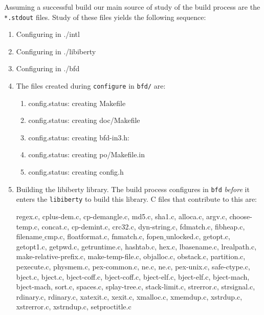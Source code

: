 Assuming  a successful build  our main  source of  study of  the build
process are the \texttt{*.stdout}  files.  Study of these files yields
the following sequence:
\begin{enumerate}[noitemsep]
\item Configuring in ./intl
\item Configuring in ./libiberty
\item Configuring in ./bfd
\item The files created during \texttt{configure} in \texttt{bfd/} are:
  \begin{enumerate}
  \item config.status: creating Makefile
  \item config.status: creating doc/Makefile
  \item config.status: creating bfd-in3.h:
  \item config.status: creating po/Makefile.in
  \item config.status: creating config.h
  \end{enumerate}
\item Building the libiberty library.  The build process configures in
  \texttt{bfd} \emph{before} it enters the \texttt{libiberty} to build
  this   library.    C   files    that   contribute   to   this   are:

  regex.c,   cplus-dem.c,  cp-demangle.c,  md5.c,   sha1.c,  alloca.c,
  argv.c, choose-temp.c, concat.c, cp-demint.c, crc32.c, dyn-string.c,
  fdmatch.c,  fibheap.c, filename$\_$cmp.c,  floatformat.c, fnmatch.c,
  fopen$\_$unlocked.c,  getopt.c,  getopt1.c, getpwd.c,  getruntime.c,
  hashtab.c, hex.c,  lbasename.c, lrealpath.c, make-relative-prefix.c,
  make-temp-file.c,  objalloc.c,  obstack.c, partition.c,  pexecute.c,
  physmem.c,  pex-common.c,   ne.c,  ne.c,  pex-unix.c,  safe-ctype.c,
  bject.c,    bject.c,   bject-coff.c,    bject-coff.c,   bject-elf.c,
  bject-elf.c, bject-mach, bject-mach, sort.c, spaces.c, splay-tree.c,
  stack-limit.c,   strerror.c,   strsignal.c,  rdinary.c,   rdinary.c,
  xatexit.c,  xexit.c, xmalloc.c,  xmemdup.c,  xstrdup.c, xstrerror.c,
  xstrndup.c, setproctitle.c


\end{enumerate}
